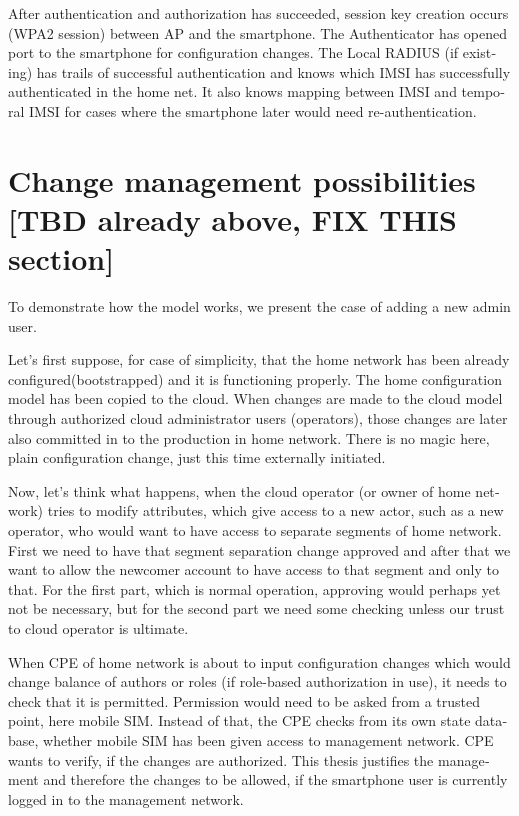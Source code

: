 \documentclass[12pt,a4paper,english]{tutthesis}
\begin{document}
\begin{otherlanguage}{english}
After authentication and authorization has succeeded, session key
creation occurs (WPA2 session) between AP and the smartphone. 
The Authenticator has opened port to the smartphone for
configuration changes. 
The Local RADIUS (if existing) has trails of successful
authentication and knows which IMSI has successfully authenticated in
the home net. It also knows mapping between IMSI and temporal IMSI for
cases where the smartphone later would need re-authentication.


\section{Change management possibilities [TBD already above, FIX THIS section]}
\label{sec-4-3}




To demonstrate how the model works, we present the case of adding a
new admin user.

Let's first suppose, for case of simplicity, that the home network has been
already configured(bootstrapped) and it is functioning properly.  The
home configuration model has been copied to the cloud.
When changes are made to the cloud model through authorized cloud
administrator users (operators), those changes are later also committed
in to the production in home network. There is no magic here, plain
configuration change, just this time externally initiated.

Now, let's think what happens, when the cloud operator (or owner of
home network) tries to modify attributes, which give access to a new actor,
such as a new operator, who would want to have access to separate
segments of home network.  First we need to have that segment separation
change approved and after that we want to allow the newcomer account
to have access to that segment and only to that. For the first part,
which is normal operation, approving would perhaps yet not be
necessary, but for the second part we need some checking unless our
trust to cloud operator is ultimate.  




When CPE of home network is about to input configuration changes which
would change balance of authors or roles (if role-based authorization
in use), it needs to check that it is permitted.  Permission would 
need to be asked from a trusted point, here mobile SIM. Instead of
that, the CPE checks from its own state database, 
whether mobile SIM has been given access to management network.
CPE wants to verify, if the changes are authorized. This thesis
justifies the management and therefore the changes to be allowed, if
the smartphone user is currently logged in to the management network.



\end{otherlanguage}
\end{document}
